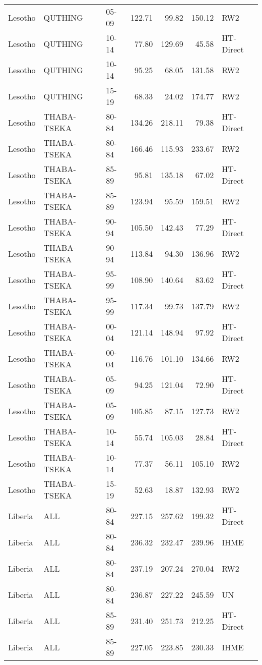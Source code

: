 \begin{longtable}{lllrrrl}
  Lesotho & QUTHING & 05-09 & 122.71 & 99.82 & 150.12 & RW2 \\ 
  Lesotho & QUTHING & 10-14 & 77.80 & 129.69 & 45.58 & HT-Direct \\ 
  Lesotho & QUTHING & 10-14 & 95.25 & 68.05 & 131.58 & RW2 \\ 
  Lesotho & QUTHING & 15-19 & 68.33 & 24.02 & 174.77 & RW2 \\ 
  Lesotho & THABA-TSEKA & 80-84 & 134.26 & 218.11 & 79.38 & HT-Direct \\ 
  Lesotho & THABA-TSEKA & 80-84 & 166.46 & 115.93 & 233.67 & RW2 \\ 
  Lesotho & THABA-TSEKA & 85-89 & 95.81 & 135.18 & 67.02 & HT-Direct \\ 
  Lesotho & THABA-TSEKA & 85-89 & 123.94 & 95.59 & 159.51 & RW2 \\ 
  Lesotho & THABA-TSEKA & 90-94 & 105.50 & 142.43 & 77.29 & HT-Direct \\ 
  Lesotho & THABA-TSEKA & 90-94 & 113.84 & 94.30 & 136.96 & RW2 \\ 
  Lesotho & THABA-TSEKA & 95-99 & 108.90 & 140.64 & 83.62 & HT-Direct \\ 
  Lesotho & THABA-TSEKA & 95-99 & 117.34 & 99.73 & 137.79 & RW2 \\ 
  Lesotho & THABA-TSEKA & 00-04 & 121.14 & 148.94 & 97.92 & HT-Direct \\ 
  Lesotho & THABA-TSEKA & 00-04 & 116.76 & 101.10 & 134.66 & RW2 \\ 
  Lesotho & THABA-TSEKA & 05-09 & 94.25 & 121.04 & 72.90 & HT-Direct \\ 
  Lesotho & THABA-TSEKA & 05-09 & 105.85 & 87.15 & 127.73 & RW2 \\ 
  Lesotho & THABA-TSEKA & 10-14 & 55.74 & 105.03 & 28.84 & HT-Direct \\ 
  Lesotho & THABA-TSEKA & 10-14 & 77.37 & 56.11 & 105.10 & RW2 \\ 
  Lesotho & THABA-TSEKA & 15-19 & 52.63 & 18.87 & 132.93 & RW2 \\ 
  Liberia & ALL & 80-84 & 227.15 & 257.62 & 199.32 & HT-Direct \\ 
  Liberia & ALL & 80-84 & 236.32 & 232.47 & 239.96 & IHME \\ 
  Liberia & ALL & 80-84 & 237.19 & 207.24 & 270.04 & RW2 \\ 
  Liberia & ALL & 80-84 & 236.87 & 227.22 & 245.59 & UN \\ 
  Liberia & ALL & 85-89 & 231.40 & 251.73 & 212.25 & HT-Direct \\ 
  Liberia & ALL & 85-89 & 227.05 & 223.85 & 230.33 & IHME \\ 

\end{longtable}
